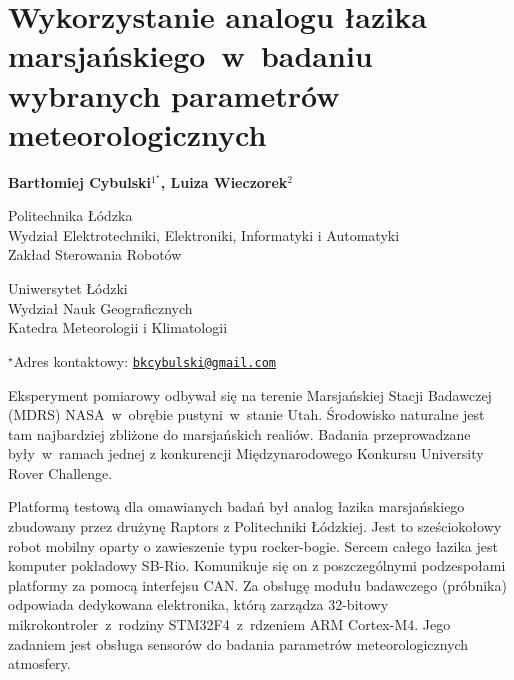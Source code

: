 \documentclass[\main/boa.tex]{subfiles}
\begin{document}
\section{Wykorzystanie analogu łazika marsjańskiego~w~badaniu wybranych parametrów meteorologicznych}

\begin{center}
  {\bf {} Bartłomiej Cybulski$^{1^\star}$,   Luiza Wieczorek$^{2}$}
\end{center}

\vskip 0.3cm

\begin{affiliations}
\begin{enumerate}
\begin{minipage}{0.915\textwidth}
\centering
\item Politechnika Łódzka\\ Wydział Elektrotechniki, Elektroniki, Informatyki i Automatyki\\ Zakład Sterowania Robotów
\item Uniwersytet Łódzki \\ Wydział Nauk Geograficznych \\ Katedra Meteorologii i Klimatologii\\[-2pt]
\end{minipage}
\end{enumerate}
$^\star$Adres kontaktowy: \href{mailto:bkcybulski@gmail.com}{\nolinkurl{bkcybulski@gmail.com}}\\
\end{affiliations}

\vskip 0.5cm


\vskip 0.5cm

Eksperyment pomiarowy odbywał się na terenie Marsjańskiej Stacji Badawczej (MDRS) NASA~w~obrębie pustyni~w~stanie Utah. Środowisko naturalne jest tam najbardziej zbliżone do marsjańskich realiów. Badania przeprowadzane były~w~ramach jednej z konkurencji Międzynarodowego Konkursu University Rover Challenge. 

Platformą testową dla omawianych badań był analog łazika marsjańskiego zbudowany przez drużynę Raptors z Politechniki Łódzkiej. Jest to sześciokołowy robot mobilny oparty o zawieszenie typu rocker-bogie. Sercem całego łazika jest komputer pokładowy SB-Rio. Komunikuje się on z poszczególnymi podzespołami platformy za pomocą interfejsu CAN. Za obsługę modułu badawczego (próbnika) odpowiada dedykowana elektronika, którą zarządza 32-bitowy mikrokontroler~z~rodziny STM32F4~z~rdzeniem ARM Cortex-M4. Jego zadaniem jest obsługa sensorów do badania parametrów meteorologicznych atmosfery.
\end{document}
